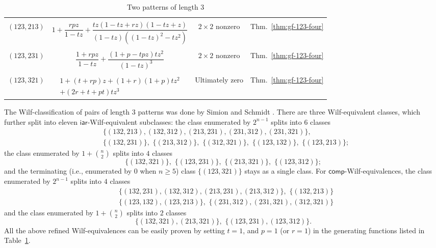 \documentclass[12pt]{amsart}
\numberwithin{equation}{section}
\theoremstyle{plain}
\theoremstyle{definition}
\def\iar{\mathsf{iar}}
\def\comp{\mathsf{comp}}
\begin{document}
\begin{table}
{\begin{tabular}{cccc}
&&&\\
$(123,213)$ & $1+\dfrac{rpz}{1-tz}+\dfrac{tz(1-tz+rz)(1-tz+z)}{(1-tz)((1-tz)^2-tz^2)}$ & $2\times 2$ nonzero & Thm.~\ref{thm:gf-123-four}\\
&&&\\
$(123,231)$ & $\dfrac{1+rpz}{1-tz}+\dfrac{(1+p-tpz)tz^2}{(1-tz)^3}$ &$2\times 2$ nonzero & Thm.~\ref{thm:gf-123-four}\\
&&&\\
$(123,321)$ & $
\begin{array}{c}
1+(t+rp)z+(1+r)(1+p)tz^2\\
+(2r+t+pt)tz^3
\end{array}
$ & Ultimately zero & Thm.~\ref{thm:gf-123-four}\\
\bottomrule
\end{tabular}
}
\caption{Two patterns of length $3$}
\label{two 3-avoiders}
\vspace{-11.5pt}
\end{table}

The Wilf-classification of pairs of length $3$ patterns was done by Simion and Schmidt \cite{SS}. There are three Wilf-equivalent classes, which further split into eleven $\iar$-Wilf-equivalent subclasses: the class enumerated by $2^{n-1}$ splits into $6$ classes
\begin{align*}
&\{(132,213), (132,312),(213,231),(231,312),(231,321)\},\\
&\{(132,231)\},\,\, \{(213,312)\}, \,\,\{(312,321)\},\,\,\{(123,132)\},\,\,\{(123,213)\};
\end{align*}
the class enumerated by $1+\binom{n}{2}$ splits into $4$ classes
$$
\{(132,321)\},\,\,\{(123, 231)\},\,\,\{(213, 321)\},\,\,\{(123, 312)\};
$$
and the terminating (i.e., enumerated by $0$ when $n\ge 5$) class $\{(123,321)\}$ stays as a single class. 
For $\comp$-Wilf-equivalences, the class enumerated by $2^{n-1}$ splits into $4$ classes
\begin{align*}
&\{(132,231),(132,312),(213,231),(213,312)\},\,\,\{(132,213)\}\\
&\{(123,132),(123,213)\}, \,\,\{(231,312),(231,321),(312,321)\}
\end{align*}
and 
the class enumerated by $1+\binom{n}{2}$ splits into $2$ classes
$$
\{(132,321),(213, 321)\},\,\,\{(123, 231),(123, 312)\}.
$$
All the above refined Wilf-equivalences can be easily proven by setting $t=1$, and $p=1$ (or $r=1$) in the generating functions listed in Table~\ref{two 3-avoiders}. 
\end{document}

